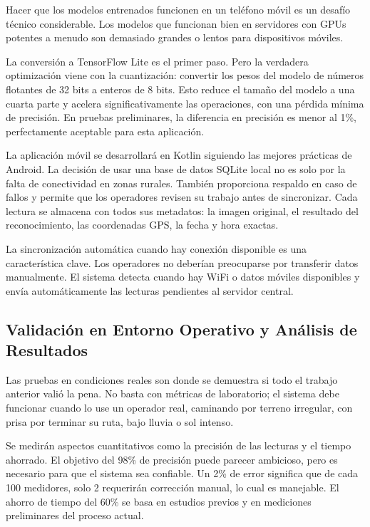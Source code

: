 Hacer que los modelos entrenados funcionen en un teléfono móvil es un desafío técnico considerable. Los modelos que funcionan bien en servidores con GPUs potentes a menudo son demasiado grandes o lentos para dispositivos móviles.

La conversión a TensorFlow Lite es el primer paso. Pero la verdadera optimización viene con la cuantización: convertir los pesos del modelo de números flotantes de 32 bits a enteros de 8 bits. Esto reduce el tamaño del modelo a una cuarta parte y acelera significativamente las operaciones, con una pérdida mínima de precisión. En pruebas preliminares, la diferencia en precisión es menor al 1\%, perfectamente aceptable para esta aplicación.

La aplicación móvil se desarrollará en Kotlin siguiendo las mejores prácticas de Android. La decisión de usar una base de datos SQLite local no es solo por la falta de conectividad en zonas rurales. También proporciona respaldo en caso de fallos y permite que los operadores revisen su trabajo antes de sincronizar. Cada lectura se almacena con todos sus metadatos: la imagen original, el resultado del reconocimiento, las coordenadas GPS, la fecha y hora exactas.

La sincronización automática cuando hay conexión disponible es una característica clave. Los operadores no deberían preocuparse por transferir datos manualmente. El sistema detecta cuando hay WiFi o datos móviles disponibles y envía automáticamente las lecturas pendientes al servidor central.

\subsection{Validación en Entorno Operativo y Análisis de Resultados}
\label{ssec:validation}

Las pruebas en condiciones reales son donde se demuestra si todo el trabajo anterior valió la pena. No basta con métricas de laboratorio; el sistema debe funcionar cuando lo use un operador real, caminando por terreno irregular, con prisa por terminar su ruta, bajo lluvia o sol intenso.

Se medirán aspectos cuantitativos como la precisión de las lecturas y el tiempo ahorrado. El objetivo del 98\% de precisión puede parecer ambicioso, pero es necesario para que el sistema sea confiable. Un 2\% de error significa que de cada 100 medidores, solo 2 requerirán corrección manual, lo cual es manejable. El ahorro de tiempo del 60\% se basa en estudios previos y en mediciones preliminares del proceso actual.

